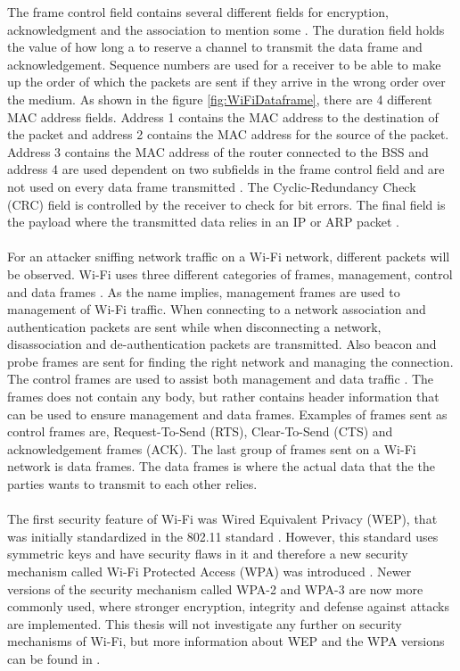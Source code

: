 The frame control field contains several different fields for encryption, acknowledgment and the association to mention some \cite{Datacom}. The duration field holds the value of how long a to reserve a channel to transmit the data frame and acknowledgement. Sequence numbers are used for a receiver to be able to make up the order of which the packets are sent if they arrive in the wrong order over the medium. As shown in the figure \ref{fig:WiFiDataframe}, there are 4 different MAC address fields. Address 1 contains the MAC address to the destination of the packet and address 2 contains the MAC address for the source of the packet. Address 3 contains the MAC address of the router connected to the BSS and address 4 are used dependent on two subfields in the frame control field and are not used on every data frame transmitted \cite{WifiStandard}. The Cyclic-Redundancy Check (CRC) field is controlled by the receiver to check for bit errors. The final field is the payload where the transmitted data relies in an IP or ARP packet \cite{Datacom}. 
\\\\
For an attacker sniffing network traffic on a Wi-Fi network, different packets will be observed. Wi-Fi uses three different categories of frames, management, control and data frames \cite{WiFiFrameMGMT}. As the name implies, management frames are used to management of Wi-Fi traffic. When connecting to a network association and authentication packets are sent while when disconnecting a network, disassociation and de-authentication packets are transmitted. Also beacon and probe frames are sent for finding the right network and managing the connection. The control frames are used to assist both management and data traffic \cite{WiFiFrames}. The frames does not contain any body, but rather contains header information that can be used to ensure management and data frames. Examples of frames sent as control frames are, Request-To-Send (RTS), Clear-To-Send (CTS) and acknowledgement frames (ACK). The last group of frames sent on a Wi-Fi network is data frames. The data frames is where the actual data that the the parties wants to transmit to each other relies. 
\\\\
The first security feature of Wi-Fi was Wired Equivalent Privacy (WEP), that was initially standardized in the 802.11 standard \cite{Datacom}. However, this standard uses symmetric keys and have security flaws in it and therefore a new security mechanism called Wi-Fi Protected Access (WPA) was introduced \cite{WAP}. Newer versions of the security mechanism called WPA-2 and WPA-3 are now more commonly used, where stronger encryption, integrity and defense against attacks are implemented. This thesis will not investigate any further on security mechanisms of Wi-Fi, but more information about WEP and the WPA versions can be found in \cite{WAP}. 